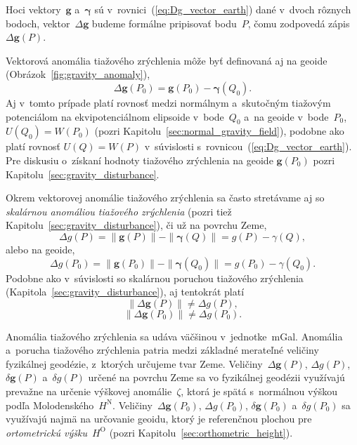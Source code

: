 \documentclass[a4paper, 12pt]{book}
\let\vec\mathbf
\begin{document}
Hoci vektory~$\vec g$ a~$\boldsymbol\gamma$ sú 
v~rovnici~(\ref{eq:Dg_vector_earth}) dané v~dvoch rôznych bodoch, 
vektor~$\Delta \vec g$ budeme formálne pripisovať bodu~$P$, čomu zodpovedá 
zápis~$\Delta \vec g(P)$.

Vektorová anomália tiažového zrýchlenia môže byť definovaná aj na geoide 
(Obrázok~\ref{fig:gravity_anomaly}),
%
\begin{equation}
\label{eq:Dg_vector_geoid}
\Delta \vec g(P_0) = \vec g(P_0) - \boldsymbol\gamma(Q_0){.}
\end{equation}
%
Aj v~tomto prípade platí rovnosť medzi normálnym a~skutočným tiažovým 
potenciálom na ekvipotenciálnom elipsoide v~bode~$Q_0$ a~na geoide 
v~bode~$P_0$, $U(Q_0) = W(P_0)$ (pozri 
Kapitolu~\ref{sec:normal_gravity_field}), podobne ako platí rovnosť $U(Q) 
= W(P)$ v~súvislosti s~rovnicou~(\ref{eq:Dg_vector_earth}).  Pre diskusiu 
o~získaní hodnoty tiažového zrýchlenia na geoide $\vec g(P_0)$ pozri 
Kapitolu~\ref{sec:gravity_disturbance}.

Okrem vektorovej anomálie tiažového zrýchlenia sa často stretávame aj so 
\emph{skalárnou anomáliou tiažového zrýchlenia} (pozri tiež 
Kapitolu~\ref{sec:gravity_disturbance}), či už na povrchu Zeme,
%
\begin{equation}
\label{eq:Dg_scalar_earth}
\Delta g(P) = \| \vec g(P) \| - \| \boldsymbol \gamma(Q) \| = g(P) 
- \gamma(Q){,}
\end{equation}
%
alebo na geoide,
%
\begin{equation}
\label{eq:Dg_scalar_geoid}
\Delta g(P_0) = \| \vec g(P_0) \| - \| \boldsymbol \gamma(Q_0) \| = g(P_0) 
- \gamma(Q_0){.}
\end{equation}
%
Podobne ako v~súvislosti so skalárnou poruchou tiažového zrýchlenia 
(Kapitola~\ref{sec:gravity_disturbance}), aj tentokrát platí
%
\begin{equation}
\| \Delta \vec g(P) \| \neq \Delta g(P){,}
\end{equation}
%
\begin{equation}
\| \Delta \vec g(P_0) \| \neq \Delta g(P_0){.}
\end{equation}

Anomália tiažového zrýchlenia sa udáva väčšinou v~jednotke~mGal.  Anomália 
a~porucha tiažového zrýchlenia patria medzi základné merateľné veličiny 
fyzikálnej geodézie, z~ktorých určujeme tvar Zeme.  Veličiny~$\Delta \vec 
g(P)$, $\Delta g(P)$, $\delta \vec g(P)$ a~$\delta g(P)$ určené na povrchu Zeme 
sa vo fyzikálnej geodézii využívajú prevažne na určenie výškovej 
anomálie~$\zeta$, ktorá je spätá s~normálnou výškou podľa 
Molodenského~$H^\mathrm{N}$.  Veličiny~$\Delta \vec g(P_0)$, $\Delta g(P_0)$, 
$\delta \vec g(P_0)$ a~$\delta g(P_0)$ sa využívajú najmä na určovanie geoidu, 
ktorý je referenčnou plochou pre \emph{ortometrickú výšku}~$H^\mathrm{O}$ 
(pozri Kapitolu~\ref{sec:orthometric_height}).
\end{document}
